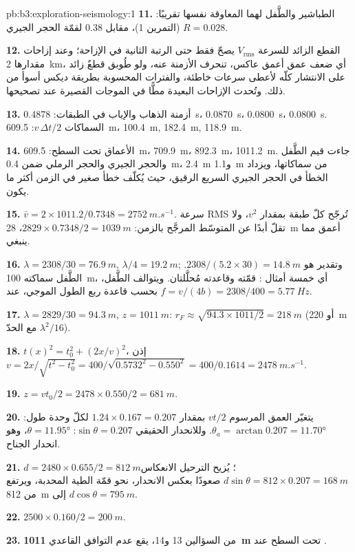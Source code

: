 \begin{solution}{pb:b3:exploration-seismology:1}
\textbf{11.} الطباشير والطَّفل لهما المعاوقة نفسها تقريبًا: $R = 0.028$
(التمرين 1)، مقابل 0.38 لقمّة الحجر الجيري.

\textbf{12.} القطع الزائد للسرعة $V_{\text{rms}}$ يصحّ فقط حتى الرتبة الثانية
في الإزاحة؛ وعند إزاحات مقدارها \qty{2}{km}، أي ضعف عمق أعمق
عاكس، تنحرف الأزمنة عنه، ولو طُوبق قطعٌ زائد على الانتشار كلّه
لأعطى سرعات خاطئة، والفترات المحسوبة بطريقة ديكس أسوأ من ذلك. وتُحدث الإزاحات البعيدة
مطًّا في الموجات القصيرة عند تصحيحها.

\textbf{13.} أزمنة الذهاب والإياب في الطبقات: \qty{0.4878}{s}، \qty{0.0870}{s}،
\qty{0.0800}{s}، \qty{0.0800}{s}. السماكات $v\,\Delta t/2$: \qty{609.5}{m}،
\qty{100.4}{m}, \qty{182.4}{m}, \qty{118.9}{m}.

\textbf{14.} الأعماق تحت السطح: \qty{609.5}{m}، \qty{709.9}{m}،
\qty{892.3}{m}، \qty{1011.2}{m}. جاءت قيم الطَّفل والحجر الجيري والحجر الرملي
ضمن \qty{0.4}{m}، \qty{2.4}{m} و\qty{1.1}{m} من سماكاتها، ويزداد
الخطأ في الحجر الجيري السريع الرقيق، حيث يُكلّف خطأ صغير في الزمن
أكثر ما يكون.

\textbf{15.} $\bar v = 2\times1011.2/0.7348 = \qty{2752}{m.s^{-1}}$. سرعة RMS
تُرجّح كلّ طبقة بمقدار $v^2$، ولا تقلّ أبدًا عن المتوسّط المرجَّح
بالزمن: $2829\times0.7348/2 = \qty{1039}{m}$، \qty{28}{m} أعمق مما ينبغي.

\textbf{16.} $\lambda = 2308/30 = \qty{76.9}{m}$, $\lambda/4 = \qty{19.2}{m}$;
وتقدير  هو $2308/(5.2\times30) = \qty{14.8}{m}$. الطَّفل
سماكته \qty{100}{m}، أي خمسة أمثال : قمّته وقاعدته
مُحلَّلتان. ويتوالف الطَّفل، بحسب قاعدة ربع الطول الموجي، عند $f = v/(4b) =
2308/400 = \qty{5.77}{Hz}$.

\textbf{17.} $\lambda = 2829/30 = \qty{94.3}{m}$, $z = \qty{1011}{m}$:
$r_F \approx \sqrt{94.3\times1011/2} = \qty{218}{m}$ (أو \qty{220}{m} مع
الحدّ $\lambda^2/16$).

\textbf{18.} $t(x)^2 = t_0^2 + (2x/v)^2$، إذن $v = 2x/\sqrt{t^2 - t_0^2} =
400/\sqrt{0.5732^2 - 0.550^2} = 400/0.1614 = \qty{2478}{m.s^{-1}}$.

\textbf{19.} $z = vt_0/2 = 2478\times0.550/2 = \qty{681}{m}$.

\textbf{20.} يتغيّر العمق المرسوم $vt/2$ بمقدار $1.24\times0.167 = 0.207$ لكلّ
وحدة طول: $\theta_a = \arctan0.207 = \ang{11.70}$. وللانحدار الحقيقي
$\sin\theta = 0.207$: $\theta = \ang{11.95}$، وهو انحدار الجناح.

\textbf{21.} $d = 2480\times0.655/2 = \qty{812}{m}$؛ يُزيح الترحيل
الانعكاس $d\sin\theta = 812\times0.207 = \qty{168}{m}$ صعودًا بعكس الانحدار، نحو
قمّة الطية المحدبة، ويرتفع من \qty{812}{m} إلى $d\cos\theta =
\qty{795}{m}$.

\textbf{22.} $2500\times0.160/2 = \qty{200}{m}$.

\textbf{23.} من السؤالين 13 و14، يقع عدم التوافق القاعدي
\textbf{\qty[text-series-to-math=true]{1011}{m}} تحت السطح عند .
\end{solution}

